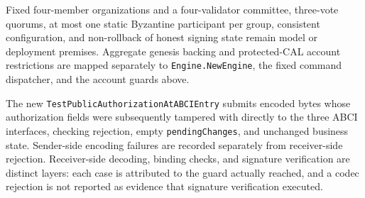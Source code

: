 Fixed four-member organizations and a four-validator committee,
three-vote quorums, at most one static Byzantine participant per
group, consistent configuration, and non-rollback of honest signing
state remain model or deployment premises. Aggregate genesis backing
and protected-CAL account restrictions are mapped separately to
\texttt{Engine.NewEngine}, the fixed command dispatcher, and the
account guards above.

The new \texttt{TestPublicAuthorizationAtABCIEntry} submits encoded
bytes whose authorization fields were subsequently tampered with
directly to the three ABCI interfaces, checking rejection, empty
\texttt{pendingChanges}, and unchanged business state.
Sender-side encoding failures are recorded separately from
receiver-side rejection. Receiver-side decoding, binding checks,
and signature verification are distinct layers: each case is
attributed to the guard actually reached, and a codec rejection
is not reported as evidence that signature verification executed.